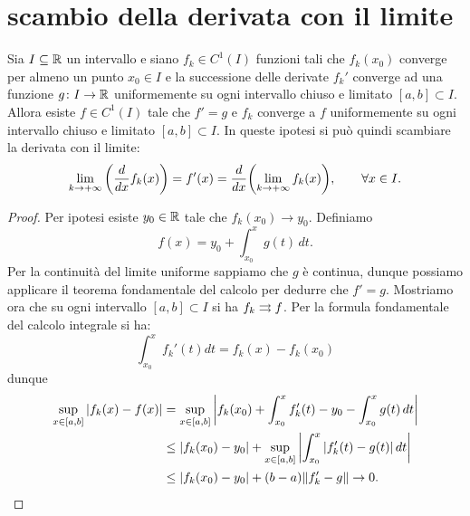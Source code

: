 \section{scambio della derivata con il limite}

\begin{theorem}
\mymark{***}
Sia $I\subseteq {\mathbb R}$ un intervallo e siano $f_k\in C^1(I)$ funzioni tali che $f_k(x_0)$ converge per almeno un punto $x_0\in I$ e la successione delle derivate $f_k'$ converge
ad una funzione $g\colon I \to {\mathbb R}$
uniformemente su ogni intervallo chiuso e limitato $[a,b]\subset I$. Allora esiste $f\in C^1(I)$ tale che $f'=g$ e $f_k$ converge a $f$ uniformemente su ogni intervallo chiuso e limitato $[a,b]\subset I$.
In queste ipotesi si può quindi scambiare la derivata con il limite:
\[
  \lim_{k\to +\infty}{\left( \frac{d}{dx} f_k(x) \right)}
  = f'(x)
  = \frac{d}{dx} {\left( \lim_{k\to +\infty} f_k(x) \right)},
  \qquad \forall x \in I.
\]
\end{theorem}
%
\begin{proof}
\mymark{***}
Per ipotesi esiste $y_0\in {\mathbb R}$ tale che $f_k(x_0) \to y_0$.
Definiamo
\[
  f(x) = y_0 + \int_{x_0}^x g(t)\, dt.
\]
Per la continuità del limite uniforme sappiamo che $g$ è continua, dunque possiamo applicare il teorema fondamentale del calcolo per dedurre che $f'=g$. Mostriamo ora che su ogni intervallo $[a,b]\subset I$ si ha $f_k \rightrightarrows f$. Per la formula fondamentale del calcolo integrale si ha:
\[
  \int_{x_0}^x f_k'(t) dt = f_k(x) - f_k(x_0)
\]
dunque
\begin{align*}
  \sup_{x\in [a,b]}{\left|f_k(x) - f(x)\right|}
  &= \sup_{x\in [a,b]} {\left|f_k(x_0) + \int_{x_0}^x f_k'(t) - y_0 - \int_{x_0}^x g(t)\, dt\right|} \\
  &\le {\left|f_k(x_0) - y_0\right|} + \sup_{x\in [a,b]}{\left|\int_{x_0}^x {\left|f_k'(t) - g(t)\right|}\, dt\right|} \\
  &\le {\left|f_k(x_0) - y_0\right|} + (b-a){\left\Vert f_k' - g\right\Vert} \to 0.
\end{align*}
\end{proof}

